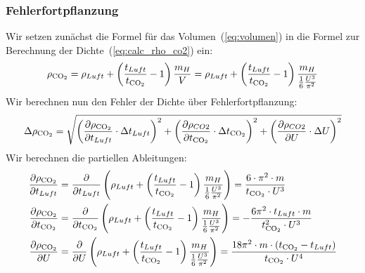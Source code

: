 \documentclass{article}
\begin{document}
          \subsubsection{Fehlerfortpflanzung}
              Wir setzen zunächst die Formel für das Volumen~(\ref{eq:volumen}) in die Formel zur Berechnung der Dichte~(\ref{eq:calc_rho_co2}) ein:
              \begin{equation}
                  \rho_{\ce{CO2}} = \rho_{Luft} + \left( \frac{t_{Luft}}{t_{\ce{CO2}}} - 1 \right) \frac{m_H}{V}\\
                  = \rho_{Luft} + \left( \frac{t_{Luft}}{t_{\ce{CO2}}} - 1 \right) \frac{m_H}{\frac{1}{6} \frac{U^3}{\pi^2}}
              \end{equation}
              Wir berechnen nun den Fehler der Dichte über Fehlerfortpflanzung:
              \begin{equation}
                  \Delta \rho_{\ce{CO2}} = \sqrt{
                  {\left( \frac{ \partial \rho_{\ce{CO2}} }{ \partial t_{Luft} } \cdot \Delta t_{Luft} \right)}^2 +
                  {\left( \frac{ \partial \rho_{CO2} }{ \partial t_{\ce{CO2}} } \cdot \Delta t_{\ce{CO2}} \right)}^2 +
                  {\left( \frac{ \partial \rho_{CO2} }{ \partial U } \cdot \Delta U \right)}^2
                  }
              \end{equation}
              Wir berechnen die partiellen Ableitungen:
              \begin{equation}
                  \begin{aligned}
                      \frac{ \partial \rho_{\ce{CO2}} }{ \partial t_{Luft} }     & = \frac{ \partial }{ \partial t_{Luft} }     \left( \rho_{Luft} + \left( \frac{t_{Luft}}{t_{\ce{CO2}}} - 1 \right) \frac{m_H}{\frac{1}{6} \frac{U^3}{\pi^2}} \right) = \frac{6 \cdot \pi^2 \cdot m}{t_{\ce{CO2}} \cdot U^3}                                  \\
                      \frac{ \partial \rho_{\ce{CO2}} }{ \partial t_{\ce{CO2}} } & = \frac{ \partial }{ \partial t_{\ce{CO2}} } \left( \rho_{Luft} + \left( \frac{t_{Luft}}{t_{\ce{CO2}}} - 1 \right) \frac{m_H}{\frac{1}{6} \frac{U^3}{\pi^2}} \right) = -\frac{6 \pi^2 \cdot t_{Luft} \cdot m }{ t_{\ce{CO2}}^2 \cdot U^3 }                   \\
                      \frac{ \partial \rho_{\ce{CO2}} }{ \partial U }            & = \frac{ \partial }{ \partial U }            \left( \rho_{Luft} + \left( \frac{t_{Luft}}{t_{\ce{CO2}}} - 1 \right) \frac{m_H}{\frac{1}{6} \frac{U^3}{\pi^2}} \right) = \frac{ 18 \pi^2 \cdot m \cdot ( t_{\ce{CO2}} - t_{Luft} ) }{ t_{\ce{CO2}} \cdot U^4 }
                  \end{aligned}
              \end{equation}
\end{document}
